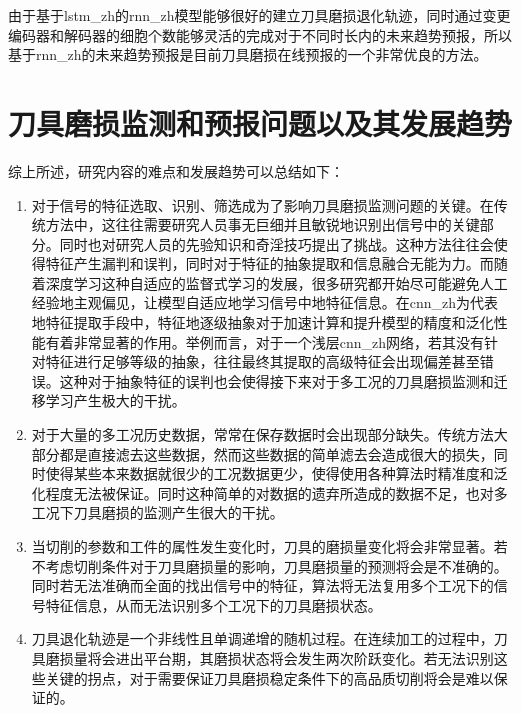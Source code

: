 由于基于\gls{lstm_zh}的\gls{rnn_zh}模型能够很好的建立刀具磨损退化轨迹，同时通过变更编码器和解码器的细胞个数能够灵活的完成对于不同时长内的未来趋势预报，所以基于\gls{rnn_zh}的未来趋势预报是目前刀具磨损在线预报的一个非常优良的方法。

\section{刀具磨损监测和预报问题以及其发展趋势}

综上所述，研究内容的难点和发展趋势可以总结如下：

\begin{enumerate}
	\item 对于信号的特征选取、识别、筛选成为了影响刀具磨损监测问题的关键。在传统方法中，这往往需要研究人员事无巨细并且敏锐地识别出信号中的关键部分。同时也对研究人员的先验知识和奇淫技巧提出了挑战。这种方法往往会使得特征产生漏判和误判，同时对于特征的抽象提取和信息融合无能为力。而随着深度学习这种自适应的监督式学习的发展，很多研究都开始尽可能避免人工经验地主观偏见，让模型自适应地学习信号中地特征信息。在\gls{cnn_zh}为代表地特征提取手段中，特征地逐级抽象对于加速计算和提升模型的精度和泛化性能有着非常显著的作用。举例而言，对于一个浅层\gls{cnn_zh}网络，若其没有针对特征进行足够等级的抽象，往往最终其提取的高级特征会出现偏差甚至错误。这种对于抽象特征的误判也会使得接下来对于多工况的刀具磨损监测和迁移学习产生极大的干扰。
	
	\item 对于大量的多工况历史数据，常常在保存数据时会出现部分缺失。传统方法大部分都是直接滤去这些数据，然而这些数据的简单滤去会造成很大的损失，同时使得某些本来数据就很少的工况数据更少，使得使用各种算法时精准度和泛化程度无法被保证。同时这种简单的对数据的遗弃所造成的数据不足，也对多工况下刀具磨损的监测产生很大的干扰。
	
	\item 当切削的参数和工件的属性发生变化时，刀具的磨损量变化将会非常显著。若不考虑切削条件对于刀具磨损量的影响，刀具磨损量的预测将会是不准确的。同时若无法准确而全面的找出信号中的特征，算法将无法复用多个工况下的信号特征信息，从而无法识别多个工况下的刀具磨损状态。
	
	\item 刀具退化轨迹是一个非线性且单调递增的随机过程。在连续加工的过程中，刀具磨损量将会进出平台期，其磨损状态将会发生两次阶跃变化。若无法识别这些关键的拐点，对于需要保证刀具磨损稳定条件下的高品质切削将会是难以保证的。
	
	
\end{enumerate}

